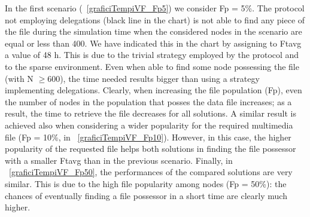 In the first scenario (\figurename~\ref{graficiTempiVF_Fp5}) we consider Fp = 5\%. The protocol not employing delegations (black line in the chart) is not able to find any piece of the file during the simulation time when the considered nodes in the scenario are equal or less than 400. We have indicated this in the chart by assigning to Ftavg a value of 48 h. This is due to the trivial strategy employed by the protocol and to the sparse environment. Even when able to find some node possessing the file (with N $\geq 600$), the time needed results bigger than using a strategy implementing delegations. Clearly, when increasing the file population (Fp), even the number of nodes in the population that posses the data file increases; as a result, the time to retrieve the file decreases for all solutions. A similar result is achieved also when considering a wider popularity for the required multimedia file (Fp = 10\%, in \figurename~\ref{graficiTempiVF_Fp10}). However, in this case, the higher popularity of the requested file helps both solutions in finding the file possessor with a smaller Ftavg than in the previous scenario.  Finally, in \figurename~\ref{graficiTempiVF_Fp50}, the performances of the compared solutions are very similar. This is due to the high file popularity among nodes (Fp = 50\%): the chances of eventually finding a file possessor in a short time are clearly much higher.


